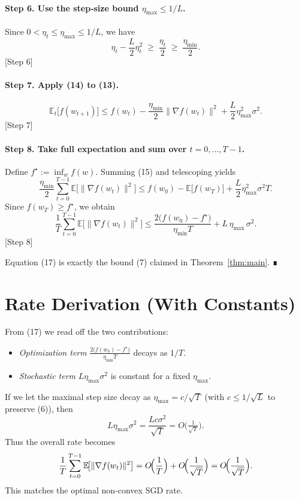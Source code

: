 \documentclass{article}
\begin{document}
\paragraph{Step 6. Use the step‑size bound $\eta_{\max}\le 1/L$.}
Since $0<\eta_t\le\eta_{\max}\le 1/L$, we have
\[
\eta_t-\frac{L}{2}\eta_t^{2}
\;\ge\;
\frac{\eta_t}{2}
\;\ge\;
\frac{\eta_{\min}}{2}.
\tag{14}
\]
[Step 6]

\paragraph{Step 7. Apply (14) to (13).}
\[
\mathbb{E}_t\!\big[f(w_{t+1})\big]
\le f(w_t)-\frac{\eta_{\min}}{2}\|\nabla f(w_t)\|^{2}
+\frac{L}{2}\eta_{\max}^{2}\sigma^{2}.
\tag{15}
\]
[Step 7]

\paragraph{Step 8. Take full expectation and sum over $t=0,\dots,T-1$.}
Define $f^\star:=\inf_{w}f(w)$. Summing (15) and telescoping yields
\[
\frac{\eta_{\min}}{2}\sum_{t=0}^{T-1}
\mathbb{E}\!\big[\|\nabla f(w_t)\|^{2}\big]
\le f(w_0)-\mathbb{E}\!\big[f(w_T)\big]
+ \frac{L}{2}\eta_{\max}^{2}\sigma^{2}T.
\tag{16}
\]
Since $f(w_T)\ge f^\star$, we obtain
\[
\frac{1}{T}\sum_{t=0}^{T-1}
\mathbb{E}\!\big[\|\nabla f(w_t)\|^{2}\big]
\le
\frac{2\big(f(w_0)-f^\star\big)}{\eta_{\min}T}
+L\,\eta_{\max}\,\sigma^{2}.
\tag{17}
\]
[Step 8]

Equation (17) is exactly the bound (7) claimed in Theorem~\ref{thm:main}. ∎

\section*{Rate Derivation (With Constants)}
From (17) we read off the two contributions:
\begin{itemize}
    \item \emph{Optimization term} $ \displaystyle \frac{2\big(f(w_0)-f^\star\big)}{\eta_{\min}T}$ decays as $1/T$.
    \item \emph{Stochastic term} $L\eta_{\max}\sigma^{2}$ is constant for a fixed $\eta_{\max}$.
\end{itemize}
If we let the maximal step size decay as $\eta_{\max}=c/\sqrt{T}$ (with $c\le 1/\sqrt{L}$ to preserve (6)), then
\[
L\eta_{\max}\sigma^{2}= \frac{Lc\sigma^{2}}{\sqrt{T}} = O\!\big(\tfrac{1}{\sqrt{T}}\big).
\]
Thus the overall rate becomes
\[
\frac{1}{T}\sum_{t=0}^{T-1}\mathbb{E}\!\big[\|\nabla f(w_t)\|^{2}\big]
= O\!\Bigl(\frac{1}{T}\Bigr)+O\!\Bigl(\frac{1}{\sqrt{T}}\Bigr)
= O\!\Bigl(\frac{1}{\sqrt{T}}\Bigr).
\]
This matches the optimal non‑convex SGD rate.
\end{document}
